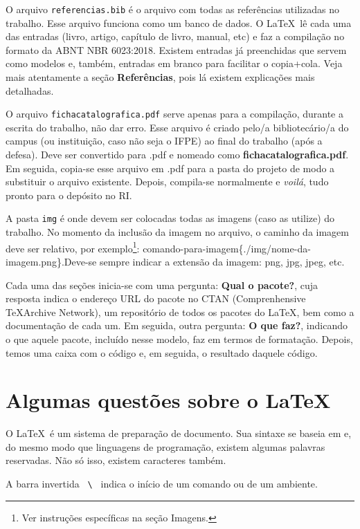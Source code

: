 \documentclass[a4paper,12pt,oneside,openright,extrafontsizes,openbib]{memoir}
\begin{document}
{O arquivo \verb|referencias.bib| é o arquivo com todas as referências utilizadas no trabalho. Esse arquivo funciona como um banco de dados. O \LaTeX\ lê cada uma das entradas (livro, artigo, capítulo de livro, manual, etc) e faz a compilação no formato da ABNT NBR 6023:2018. Existem entradas já preenchidas que servem como modelos e, também, entradas em branco para facilitar o copia+cola. Veja mais atentamente a seção \textbf{Referências}, pois lá existem explicações mais detalhadas.

O arquivo \verb|fichacatalografica.pdf| serve apenas para a compilação, durante a escrita do trabalho, não dar erro. Esse arquivo é criado pelo/a bibliotecário/a do campus (ou instituição, caso não seja o IFPE) ao final do trabalho (após a defesa). Deve ser convertido para .pdf e nomeado como \textbf{fichacatalografica.pdf}. Em seguida, copia-se esse arquivo em .pdf para a pasta do projeto de modo a substituir o arquivo existente. Depois, compila-se normalmente e \textit{voilá}, tudo pronto para o depósito no RI.

A pasta \verb|img| é onde devem ser colocadas todas as imagens (caso as utilize) do trabalho. No momento da inclusão da imagem no arquivo, o caminho da imagem deve ser relativo, por exemplo\footnote{Ver instruções específicas na seção Imagens.}: comando-para-imagem\{./img/nome-da-imagem.png\}.Deve-se sempre  indicar a extensão da imagem: png, jpg, jpeg, etc.

Cada uma das seções inicia-se com uma pergunta: \textbf{Qual o pacote?}, cuja resposta indica o endereço URL do pacote no CTAN (Comprenhensive \TeX Archive Network), um repositório de todos os pacotes do \LaTeX, bem como a documentação de cada um. Em seguida, outra pergunta: \textbf{O que faz?}, indicando o que aquele pacote, incluído nesse modelo, faz em termos de formatação. Depois, temos uma caixa com o código e, em seguida, o resultado daquele código.

\section{Algumas questões sobre o \LaTeX}

O \LaTeX\ é um sistema de preparação de documento. Sua sintaxe se baseia em  e, do mesmo modo que linguagens de programação, existem algumas palavras reservadas. Não só isso, existem caracteres  também.

A barra invertida \verb| \ | indica o início de um comando ou de um ambiente.

}
\end{document}
